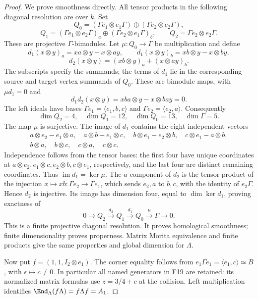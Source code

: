 \documentclass[11pt,a4paper]{article}
\newcommand{\fid}[1]{\textsf{#1}}\newcommand{\gate}[1]{\textsf{#1}}
\theoremstyle{named}\newtheorem{finding}{Finding}[section]
\theoremstyle{definition}\newtheorem{definition}[finding]{Definition}
\theoremstyle{remark}\newtheorem{remark}[finding]{Remark}
\begin{document}
\begin{proof}
We prove smoothness directly. All tensor products in the following
diagonal resolution are over $k$. Set
\[
 Q_0=(\Gamma e_1\otimes e_1\Gamma)
          \oplus(\Gamma e_2\otimes e_2\Gamma),
\]
\[
 Q_1=(\Gamma e_1\otimes e_2\Gamma)_a
          \oplus(\Gamma e_2\otimes e_1\Gamma)_b,\qquad
 Q_2=\Gamma e_2\otimes e_2\Gamma.
\]
These are projective $\Gamma$-bimodules. Let $\mu:Q_0\to\Gamma$
be multiplication and define
\[
 d_1(x\otimes y)_a=xa\otimes y-x\otimes ay,\qquad
 d_1(x\otimes y)_b=xb\otimes y-x\otimes by,
\]
\[
 d_2(x\otimes y)=(xb\otimes y)_a+(x\otimes ay)_b.
\]
The subscripts specify the summands; the terms of $d_1$ lie in
the corresponding source and target vertex summands of $Q_0$.
These are bimodule maps, with $\mu d_1=0$ and
\[
 d_1d_2(x\otimes y)=xba\otimes y-x\otimes bay=0.
\]
The left ideals have bases
$\Gamma e_1=\langle e_1,b,c\rangle$ and
$\Gamma e_2=\langle e_2,a\rangle$. Consequently
\[
 \dim Q_2=4,\quad\dim Q_1=12,\quad\dim Q_0=13,\quad
 \dim\Gamma=5.
\]
The map $\mu$ is surjective. The image of $d_1$ contains the
eight independent vectors
\[
 \begin{gathered}
 a\otimes e_2-e_1\otimes a,\quad
 a\otimes b-e_1\otimes c,\quad
 b\otimes e_1-e_2\otimes b,\quad
 c\otimes e_1-a\otimes b,\\
 b\otimes a,\quad b\otimes c,\quad
 c\otimes a,\quad c\otimes c.
 \end{gathered}
\]
Independence follows from the tensor bases: the first four have
unique coordinates at $a\otimes e_2,e_1\otimes c,e_2\otimes b,
c\otimes e_1$, respectively, and the last four are distinct
remaining coordinates. Thus $\operatorname{im}d_1=\ker\mu$.
The $a$-component of $d_2$ is the tensor product of the injection
$x\mapsto xb:\Gamma e_2\to\Gamma e_1$, which sends $e_2,a$
to $b,c$, with the identity of $e_2\Gamma$. Hence $d_2$ is
injective. Its image has dimension four, equal to
$\dim\ker d_1$, proving exactness of
\begin{equation}\label{eq:auslanderdiagonal}
 0\longrightarrow Q_2\xrightarrow{d_2}Q_1
   \xrightarrow{d_1}Q_0\xrightarrow{\mu}\Gamma
   \longrightarrow0.
\end{equation}
This is a finite projective diagonal resolution. It proves
homological smoothness; finite dimensionality proves properness.
Matrix Morita equivalence and finite products give the same
properties and global dimension for $\Lambda$.

Now put $f=(1,1,I_2\otimes e_1)$. The corner equality follows
from $e_1\Gamma e_1=\langle e_1,c\rangle\simeq B$, with
$\epsilon\mapsto c\ne0$. In particular all named generators in
\fid{F19} are retained: its normalized matrix formulas use
$z=3/4+c$ at the collision. Left multiplication identifies
$\End_\Lambda(f\Lambda)=f\Lambda f=A_1$.


\end{proof}
\end{document}
